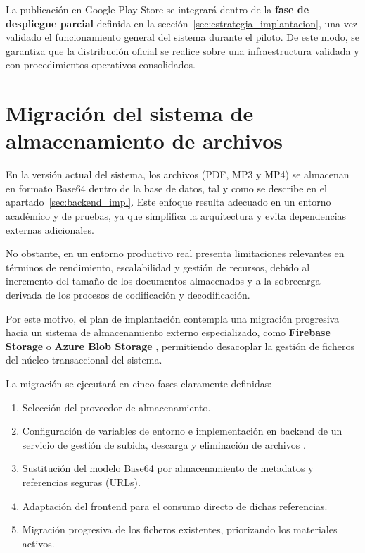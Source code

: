 La publicación en Google Play Store se integrará dentro de la \textbf{fase de despliegue parcial} definida en la sección~\ref{sec:estrategia_implantacion}, una vez validado el funcionamiento general del sistema durante el piloto. De este modo, se garantiza que la distribución oficial se realice sobre una infraestructura validada y con procedimientos operativos consolidados.

\section{Migración del sistema de almacenamiento de archivos}
\label{sec:migracion_archivos}

En la versión actual del sistema, los archivos (PDF, MP3 y MP4) se almacenan en formato Base64 dentro de la base de datos, tal y como se describe en el apartado~\ref{sec:backend_impl}. Este enfoque resulta adecuado en un entorno académico y de pruebas, ya que simplifica la arquitectura y evita dependencias externas adicionales.

No obstante, en un entorno productivo real presenta limitaciones relevantes en términos de rendimiento, escalabilidad y gestión de recursos, debido al incremento del tamaño de los documentos almacenados y a la sobrecarga derivada de los procesos de codificación y decodificación.

Por este motivo, el plan de implantación contempla una migración progresiva hacia un sistema de almacenamiento externo especializado, como \textbf{Firebase Storage} \cite{firebase_storage_docs} o \textbf{Azure Blob Storage} \cite{azure_blob_storage_docs}, permitiendo desacoplar la gestión de ficheros del núcleo transaccional del sistema.

La migración se ejecutará en cinco fases claramente definidas:

\begin{enumerate}
    \item Selección del proveedor de almacenamiento.
    \item Configuración de variables de entorno e implementación en backend de un servicio de gestión de subida, descarga y eliminación de archivos \cite{RFC7578}.
    \item Sustitución del modelo Base64 por almacenamiento de metadatos y referencias seguras (URLs).
    \item Adaptación del frontend para el consumo directo de dichas referencias.
    \item Migración progresiva de los ficheros existentes, priorizando los materiales activos.
\end{enumerate}

